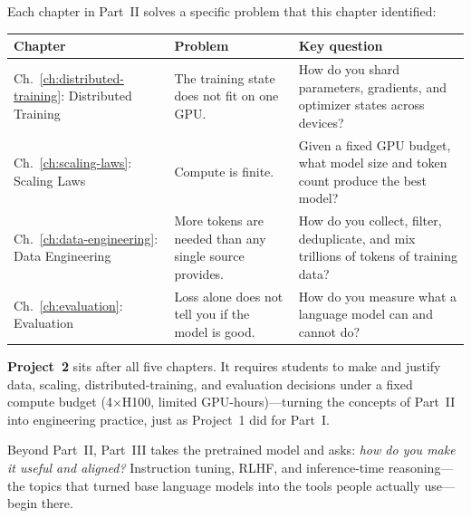 Each chapter in Part~II solves a specific problem that this chapter identified:

\begin{center}
\small
\begin{tabularx}{\textwidth}{@{}p{}p{}X@{}}
\toprule
\textbf{Chapter} & \textbf{Problem} & \textbf{Key question} \\
\midrule
Ch.~\ref{ch:distributed-training}: Distributed Training &
  The training state does not fit on one GPU. &
  How do you shard parameters, gradients, and optimizer states across devices? \\[4pt]
Ch.~\ref{ch:scaling-laws}: Scaling Laws &
  Compute is finite. &
  Given a fixed GPU budget, what model size and token count produce the best model? \\[4pt]
Ch.~\ref{ch:data-engineering}: Data Engineering &
  More tokens are needed than any single source provides. &
  How do you collect, filter, deduplicate, and mix trillions of tokens of training data? \\[4pt]
Ch.~\ref{ch:evaluation}: Evaluation &
  Loss alone does not tell you if the model is good. &
  How do you measure what a language model can and cannot do? \\
\bottomrule
\end{tabularx}
\end{center}

\textbf{Project~2} sits after all five chapters. It requires students to make and justify data, scaling, distributed-training, and evaluation decisions under a fixed compute budget (4$\times$H100, limited GPU-hours)---turning the concepts of Part~II into engineering practice, just as Project~1 did for Part~I.

\medskip
\noindent Beyond Part~II, Part~III takes the pretrained model and asks: \emph{how do you make it useful and aligned?} Instruction tuning, RLHF, and inference-time reasoning---the topics that turned base language models into the tools people actually use---begin there.



